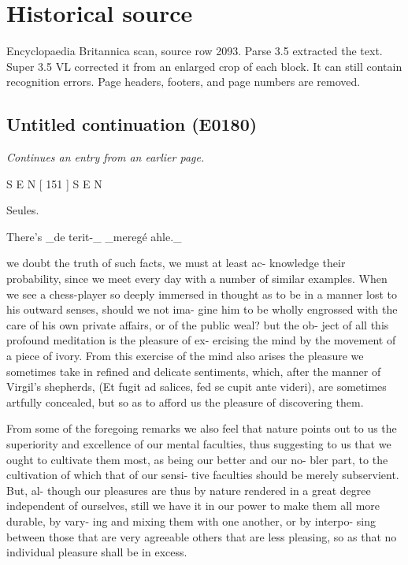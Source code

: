 \documentclass{article}
\begin{document}
\section*{Historical source}
Encyclopaedia Britannica scan, source row 2093. Parse 3.5 extracted the text. Super 3.5 VL corrected it from an enlarged crop of each block. It can still contain recognition errors.
Page headers, footers, and page numbers are removed.

\subsection*{Untitled continuation (E0180)}
\textit{Continues an entry from an earlier page.}

S E N [ 151 ] S E N

Seules.

There’s \_de terit-\_
\_meregé ahle.\_

we doubt the truth of such facts, we must at least ac-
knowledge their probability, since we meet every day
with a number of similar examples. When we see a
chess-player so deeply immersed in thought as to be in a
manner lost to his outward senses, should we not ima-
gine him to be wholly engrossed with the care of his
own private affairs, or of the public weal? but the ob-
ject of all this profound meditation is the pleasure of ex-
ercising the mind by the movement of a piece of ivory.
From this exercise of the mind also arises the pleasure
we sometimes take in refined and delicate sentiments,
which, after the manner of Virgil's shepherds, (Et
fugit ad salices, fed se cupit ante videri), are sometimes
artfully concealed, but so as to afford us the pleasure of
discovering them.

From some of the foregoing remarks we also feel that
nature points out to us the superiority and excellence of
our mental faculties, thus suggesting to us that we ought
to cultivate them most, as being our better and our no-
bler part, to the cultivation of which that of our sensi-
tive faculties should be merely subservient. But, al-
though our pleasures are thus by nature rendered in a
great degree independent of ourselves, still we have it
in our power to make them all more durable, by vary-
ing and mixing them with one another, or by interpo-
sing between those that are very agreeable others that
are less pleasing, so as that no individual pleasure shall
be in excess.
\end{document}

